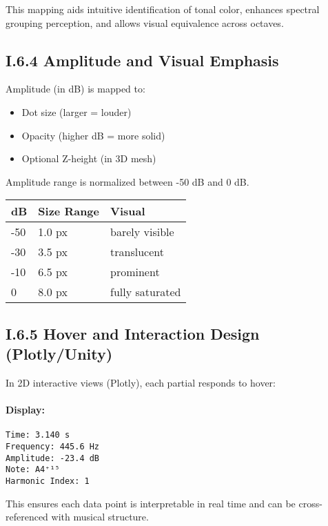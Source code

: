 This mapping aids intuitive identification of tonal color, enhances spectral grouping perception, and allows visual equivalence across octaves.

\subsection*{I.6.4 Amplitude and Visual Emphasis}

Amplitude (in dB) is mapped to:

\begin{itemize}
    \item Dot size (larger = louder)
    \item Opacity (higher dB = more solid)
    \item Optional Z-height (in 3D mesh)
\end{itemize}

Amplitude range is normalized between -50 dB and 0 dB.

\begin{center}
\begin{tabular}{|l|l|l|}
\hline
\textbf{dB} & \textbf{Size Range} & \textbf{Visual} \\
\hline
-50 & 1.0 px & barely visible \\
-30 & 3.5 px & translucent \\
-10 & 6.5 px & prominent \\
0   & 8.0 px & fully saturated \\
\hline
\end{tabular}
\end{center}

\subsection*{I.6.5 Hover and Interaction Design (Plotly/Unity)}

In 2D interactive views (Plotly), each partial responds to hover:

\paragraph{Display:}

\begin{verbatim}
Time: 3.140 s
Frequency: 445.6 Hz
Amplitude: -23.4 dB
Note: A4⁺¹⁵
Harmonic Index: 1
\end{verbatim}

This ensures each data point is interpretable in real time and can be cross-referenced with musical structure.

